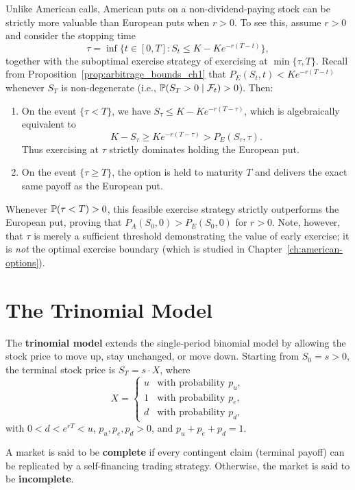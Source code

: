Unlike American calls, American puts on a non-dividend-paying stock can be strictly more valuable than European puts when $r > 0$. To see this, assume $r > 0$ and consider the stopping time
\[
    \tau = \inf\bigl\{ t \in [0, T] : S_t \le K - K e^{-r(T-t)} \bigr\},
\]
together with the suboptimal exercise strategy of exercising at $\min\{\tau, T\}$. Recall from Proposition~\ref{prop:arbitrage_bounds_ch1} that $P_E(S_t, t) < K e^{-r(T-t)}$ whenever $S_T$ is non-degenerate (i.e., $\mathbb{P}(S_T > 0 \mid \mathcal{F}_t) > 0$). Then:
\begin{enumerate}
    \item On the event $\{\tau < T\}$, we have $S_\tau \le K - K e^{-r(T-\tau)}$, which is algebraically equivalent to
    \[
        K - S_\tau \ge K e^{-r(T-\tau)} > P_E(S_\tau, \tau).
    \]
    Thus exercising at $\tau$ strictly dominates holding the European put.
    \item On the event $\{\tau \ge T\}$, the option is held to maturity $T$ and delivers the exact same payoff as the European put.
\end{enumerate}
Whenever $\mathbb{P}(\tau < T) > 0$, this feasible exercise strategy strictly outperforms the European put, proving that $P_A(S_0, 0) > P_E(S_0, 0)$ for $r > 0$. Note, however, that $\tau$ is merely a sufficient threshold demonstrating the value of early exercise; it is \emph{not} the optimal exercise boundary (which is studied in Chapter~\ref{ch:american-options}).

\section{The Trinomial Model}
\label{sec:trinomial}

The \textbf{trinomial model} extends the single-period binomial model by allowing the stock price to move up, stay unchanged, or move down. Starting from $S_0 = s > 0$, the terminal stock price is $S_T = s \cdot X$, where
\[
    X =
    \begin{cases}
        u & \text{with probability } p_u, \\
        1 & \text{with probability } p_e, \\
        d & \text{with probability } p_d,
    \end{cases}
\]
with $0 < d < e^{rT} < u$, $p_u, p_e, p_d > 0$, and $p_u + p_e + p_d = 1$.

\begin{definition}
\label{def:complete_market}
A market is said to be \textbf{complete} if every contingent claim (terminal payoff) can be replicated by a self-financing trading strategy. Otherwise, the market is said to be \textbf{incomplete}.
\end{definition}


